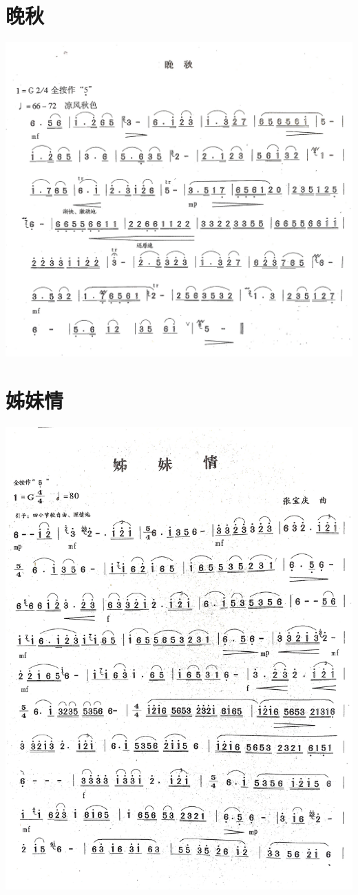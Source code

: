 \documentclass[cn,pad,chinese,chinesefont=nofont]{elegantbook}
\begin{document}
\section{晚秋}    
	\includegraphics[width=\textwidth]{dongxiao/IMG_0945.jpg}   
\section{姊妹情}   
	\includegraphics[width=\textwidth]{dongxiao/IMG_0946.jpg}
\end{document}
